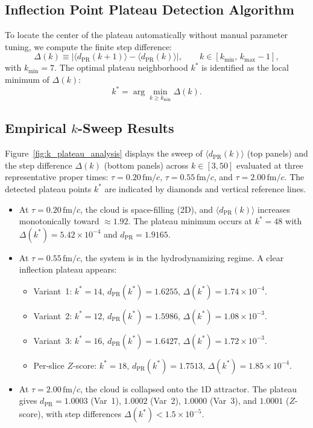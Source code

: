 \documentclass[11pt,a4paper]{article}
\begin{document}
\subsection{Inflection Point Plateau Detection Algorithm}
To locate the center of the plateau automatically without manual parameter tuning, we compute the finite step difference:
\begin{equation}
    \Delta(k) \equiv \Big| \langle d_{\mathrm{PR}}(k+1) \rangle - \langle d_{\mathrm{PR}}(k) \rangle \Big|, \qquad k \in [k_{\min}, \, k_{\max}-1],
    \label{eq:delta_k_def}
\end{equation}
with $k_{\min} = 7$. The optimal plateau neighborhood $k^*$ is identified as the local minimum of $\Delta(k)$:
\begin{equation}
    k^* = \arg\min_{k \ge k_{\min}} \Delta(k).
    \label{eq:k_star_def}
\end{equation}

\subsection{Empirical \texorpdfstring{$k$}{k}-Sweep Results}
Figure~\ref{fig:k_plateau_analysis} displays the sweep of $\langle d_{\mathrm{PR}}(k) \rangle$ (top panels) and the step difference $\Delta(k)$ (bottom panels) across $k \in [3, 50]$ evaluated at three representative proper times: $\tau = 0.20\,\mathrm{fm}/c$, $\tau = 0.55\,\mathrm{fm}/c$, and $\tau = 2.00\,\mathrm{fm}/c$. The detected plateau points $k^*$ are indicated by diamonds and vertical reference lines.
\begin{itemize}
    \item At $\tau = 0.20\,\mathrm{fm}/c$, the cloud is space-filling (2D), and $\langle d_{\mathrm{PR}}(k) \rangle$ increases monotonically toward $\approx 1.92$. The plateau minimum occurs at $k^* = 48$ with $\Delta(k^*) = 5.42 \times 10^{-4}$ and $d_{\mathrm{PR}} = 1.9165$.
    \item At $\tau = 0.55\,\mathrm{fm}/c$, the system is in the hydrodynamizing regime. A clear inflection plateau appears:
    \begin{itemize}
        \item Variant~1: $k^* = 14$, $d_{\mathrm{PR}}(k^*) = 1.6255$, $\Delta(k^*) = 1.74 \times 10^{-4}$.
        \item Variant~2: $k^* = 12$, $d_{\mathrm{PR}}(k^*) = 1.5986$, $\Delta(k^*) = 1.08 \times 10^{-3}$.
        \item Variant~3: $k^* = 16$, $d_{\mathrm{PR}}(k^*) = 1.6427$, $\Delta(k^*) = 1.72 \times 10^{-3}$.
        \item Per-slice $Z$-score: $k^* = 18$, $d_{\mathrm{PR}}(k^*) = 1.7513$, $\Delta(k^*) = 1.85 \times 10^{-4}$.
    \end{itemize}
    \item At $\tau = 2.00\,\mathrm{fm}/c$, the cloud is collapsed onto the 1D attractor. The plateau gives $d_{\mathrm{PR}} = 1.0003$ (Var~1), $1.0002$ (Var~2), $1.0000$ (Var~3), and $1.0001$ ($Z$-score), with step differences $\Delta(k^*) < 1.5 \times 10^{-5}$.
\end{itemize}
\end{document}

